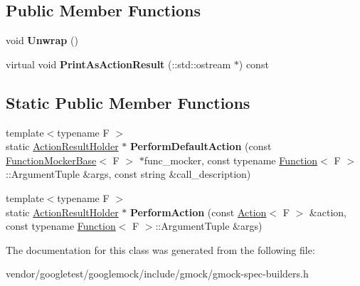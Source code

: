 \subsection*{Public Member Functions}
\begin{DoxyCompactItemize}
\item 
\mbox{\label{classtesting_1_1internal_1_1_action_result_holder_3_01void_01_4_aa57f371e1559b236e6424b2f50dcd6a2}} 
void {\bfseries Unwrap} ()
\item 
\mbox{\label{classtesting_1_1internal_1_1_action_result_holder_3_01void_01_4_ab829399d5a7d6fc9f0ecde0c0a6a3aeb}} 
virtual void {\bfseries Print\+As\+Action\+Result} (\+::std\+::ostream $\ast$) const
\end{DoxyCompactItemize}
\subsection*{Static Public Member Functions}
\begin{DoxyCompactItemize}
\item 
\mbox{\label{classtesting_1_1internal_1_1_action_result_holder_3_01void_01_4_a140b6ab6a756e60db62e76b01b09a26f}} 
{\footnotesize template$<$typename F $>$ }\\static \hyperlink{classtesting_1_1internal_1_1_action_result_holder}{Action\+Result\+Holder} $\ast$ {\bfseries Perform\+Default\+Action} (const \hyperlink{classtesting_1_1internal_1_1_function_mocker_base}{Function\+Mocker\+Base}$<$ F $>$ $\ast$func\+\_\+mocker, const typename \hyperlink{structtesting_1_1internal_1_1_function}{Function}$<$ F $>$\+::Argument\+Tuple \&args, const string \&call\+\_\+description)
\item 
\mbox{\label{classtesting_1_1internal_1_1_action_result_holder_3_01void_01_4_abb1d387e21341393e0c237ae7b02ee68}} 
{\footnotesize template$<$typename F $>$ }\\static \hyperlink{classtesting_1_1internal_1_1_action_result_holder}{Action\+Result\+Holder} $\ast$ {\bfseries Perform\+Action} (const \hyperlink{classtesting_1_1_action}{Action}$<$ F $>$ \&action, const typename \hyperlink{structtesting_1_1internal_1_1_function}{Function}$<$ F $>$\+::Argument\+Tuple \&args)
\end{DoxyCompactItemize}


The documentation for this class was generated from the following file\+:\begin{DoxyCompactItemize}
\item 
vendor/googletest/googlemock/include/gmock/gmock-\/spec-\/builders.\+h\end{DoxyCompactItemize}
